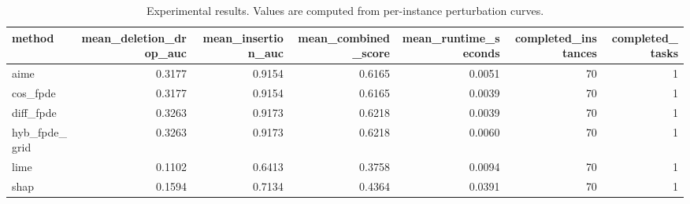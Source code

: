 \begin{table}[t]
\caption{Experimental results. Values are computed from per-instance perturbation curves.}
\label{tab:main_results_computed}
\centering
\begin{tabular}{lrrrrrr}
\toprule
method & mean\_deletion\_drop\_auc & mean\_insertion\_auc & mean\_combined\_score & mean\_runtime\_seconds & completed\_instances & completed\_tasks \\
\midrule
aime & 0.3177 & 0.9154 & 0.6165 & 0.0051 & 70 & 1 \\
cos\_fpde & 0.3177 & 0.9154 & 0.6165 & 0.0039 & 70 & 1 \\
diff\_fpde & 0.3263 & 0.9173 & 0.6218 & 0.0039 & 70 & 1 \\
hyb\_fpde\_grid & 0.3263 & 0.9173 & 0.6218 & 0.0060 & 70 & 1 \\
lime & 0.1102 & 0.6413 & 0.3758 & 0.0094 & 70 & 1 \\
shap & 0.1594 & 0.7134 & 0.4364 & 0.0391 & 70 & 1 \\
\bottomrule
\end{tabular}

\end{table}
